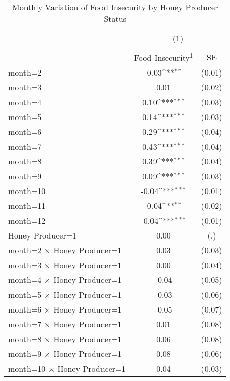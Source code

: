 \begin{table}[htbp]\centering \small
\def\sym#1{\ifmmode^{#1}\else\(^{#1}\)\fi}
\caption{Monthly Variation of Food Insecurity by Honey Producer Status \label{table_monthly_producer_status}}
\begin{tabular}{l*{1}{cc}}
\toprule
                &\multicolumn{2}{c}{(1)}     \\
                &\multicolumn{2}{c}{ }       \\
                &Food Insecurity\textsuperscript{1}         &       SE\\
\midrule
month=2         &    -0.03\sym{**} &   (0.01)\\
month=3         &     0.01         &   (0.02)\\
month=4         &     0.10\sym{***}&   (0.03)\\
month=5         &     0.14\sym{***}&   (0.03)\\
month=6         &     0.29\sym{***}&   (0.04)\\
month=7         &     0.43\sym{***}&   (0.04)\\
month=8         &     0.39\sym{***}&   (0.04)\\
month=9         &     0.09\sym{***}&   (0.03)\\
month=10        &    -0.04\sym{***}&   (0.01)\\
month=11        &    -0.04\sym{**} &   (0.02)\\
month=12        &    -0.04\sym{***}&   (0.01)\\
Honey Producer=1&     0.00         &      (.)\\
month=2 $\times$ Honey Producer=1&     0.03         &   (0.03)\\
month=3 $\times$ Honey Producer=1&     0.00         &   (0.04)\\
month=4 $\times$ Honey Producer=1&    -0.04         &   (0.05)\\
month=5 $\times$ Honey Producer=1&    -0.03         &   (0.06)\\
month=6 $\times$ Honey Producer=1&    -0.05         &   (0.07)\\
month=7 $\times$ Honey Producer=1&     0.01         &   (0.08)\\
month=8 $\times$ Honey Producer=1&     0.06         &   (0.08)\\
month=9 $\times$ Honey Producer=1&     0.08         &   (0.06)\\
month=10 $\times$ Honey Producer=1&     0.04         &   (0.03)\\

\end{tabular}
\end{table}
